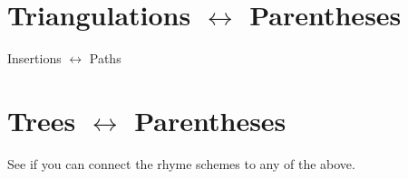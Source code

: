 \documentclass{article}
\begin{document}
\section[\ \ \ \ \ \ \ \ \ \ \ \ \ \ \ \ \ \ \ \ \ \ \ \ \ \ \ \ \ \ \ \ \ \ \ \ \ \ \ \ \ \ \ Triangulations
$\leftrightarrow $ Parentheses]{ Triangulations $\leftrightarrow $ Parentheses}
 Insertions $\leftrightarrow $ Paths

\section[\ \ \ \ \ \ \ \ \ \ \ \ \ \ \ \ \ \ \ \ \ \ \ \ \ \ \ \ \ \ \ \ \ \ \ \ \ \ \ \ \ \ \ \ \ \ \ \ \ \ \ \ \ \ \ \ \ \ Trees
$\leftrightarrow $ Parentheses]{ Trees $\leftrightarrow $ Parentheses}
See if you can connect the rhyme schemes to any of the above.
\end{document}
